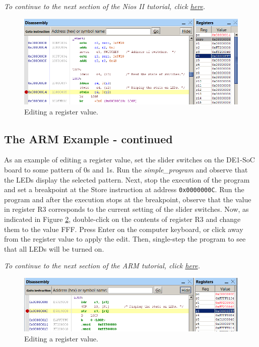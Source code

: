 \documentclass[11pt, twoside, pdftex]{article}
\begin{document}
{\it To continue to the next section of the Nios II tutorial, click \hyperref[tut:nios_6]{here}.}

\begin{figure}[H]
   \begin{center}
      \includegraphics[scale=1]{screenshots/figure34.png}
   \end{center}
   \caption{Editing a register value.} 
   \label{fig:AMP_editregister_nios}
\end{figure}


\subsection{The ARM Example - continued}
\label{tut:arm_4}

As an example of editing a register value, set the slider
switches on the DE1-SoC board to some pattern of 0s and 1s.
Run the {\it simple\_program} and observe that the LEDs display
the selected pattern. Next, stop the execution of the program
and set a breakpoint at the Store instruction
at address \texttt{0x0000000C}. Run the program and
after the execution stops at the breakpoint, observe that the
value in register R3 corresponds to the current setting of the
slider switches. 
Now,  as indicated in Figure \ref{fig:AMP_editregister_arm}, double-click on the contents of
register R3 and change them to the value FFF.  
Press \textsf{Enter} on the computer keyboard, or click away from
the register value to apply the edit. 
Then, single-step the program to see that all LEDs will be
turned on. 

{\it To continue to the next section of the ARM tutorial, click \hyperref[tut:arm_5]{here}.}

\begin{figure}[H]
   \begin{center}
      \includegraphics[scale=1]{screenshots/figure35.png}
   \end{center}
   \caption{Editing a register value.} 
   \label{fig:AMP_editregister_arm}
\end{figure}
\end{document}
